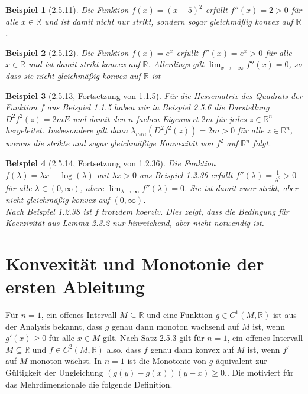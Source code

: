 \documentclass[12pt]{extreport} %
\newcommand{\R}{\mathbb{R}}
\theoremstyle{named}
\theoremstyle{nnamed}
\theoremstyle{itshape}
\theoremstyle{normal}
\newtheorem*{beispiel}{Beispiel}
\begin{document}
\begin{beispiel}[2.5.11]
	Die Funktion $f(x) = (x - 5)^2 $ erfüllt $f''(x) = 2 > 0$ für alle $x \in \R$ und ist damit nicht nur strikt, sondern sogar gleichmäßig konvex auf $\R$.	
\end{beispiel}

\begin{beispiel}[2.5.12]
Die Funktion $f(x) = e^x$ erfüllt $f''(x) = e^x > 0$ für alle $x \in \R$ und ist damit strikt konvex auf $\R$. Allerdings gilt $\lim_{x \rightarrow -\infty} f''(x) = 0$, so dass sie nicht gleichmäßig konvex auf $\R$ ist
\end{beispiel}

\begin{beispiel}[2.5.13, Fortsetzung von 1.1.5]
	Für die Hessematrix des Quadrats der Funktion $f$ aus Beispiel 1.1.5 haben wir in Beispiel 2.5.6 die Darstellung $D^2 f^2(z) = 2mE$ und damit den $n$-fachen Eigenwert $2m$ für jedes $z \in \R^n$ hergeleitet. Insbesondere gilt dann $\lambda_{min}(D^2 f^2(z)) = 2m > 0$ für alle $z \in \R^n$, woraus die strikte und sogar gleichmäßige Konvexität von $f^2$ auf $\R^n$ folgt. 
\end{beispiel}

\begin{beispiel}[2.5.14, Fortsetzung von 1.2.36]
	Die Funktion $f(\lambda) = \lambda \overline{x} - \log(\lambda)$ mit $\lambda{x} > 0$ aus Beispiel 1.2.36 erfüllt $f''(\lambda) = \frac{1}{\lambda^2} > 0$ für alle $\lambda \in (0, \infty)$, abere $\lim_{\lambda \rightarrow \infty} f''(\lambda) = 0$. Sie ist damit zwar strikt, aber nicht gleichmäßig konvex auf $(0, \infty)$. ~\\
	
	Nach Beispiel 1.2.38 ist $f$ trotzdem koerziv. Dies zeigt, dass die Bedingung für Koerzivität aus Lemma 2.3.2 nur hinreichend, aber nicht notwendig ist.
\end{beispiel}

\section{Konvexität und Monotonie der ersten Ableitung}

Für $n = 1$, ein offenes Intervall $M \subseteq \R$ und eine Funktion $g \in C^1(M, \R)$ ist aus der Analysis bekannt, dass $g$ genau dann monoton wachsend auf $M$ ist, wenn $g'(x) \geq 0$ für alle $x \in M$ gilt. Nach Satz 2.5.3 gilt für $n = 1$, ein offenes Intervall $M \subseteq \R$ und $f \in C^2(M, \R)$ also, dass $f$ genau dann konvex auf $M$ ist, wenn $f'$ auf $M$ monoton wächst.  In $n = 1$ ist die Monotonie von $g$ äquivalent zur Gültigkeit der Ungleichung $(g(y) - g(x))(y - x) \geq 0$.. Die motiviert für das Mehrdimensionale die folgende Definition.
\end{document}
